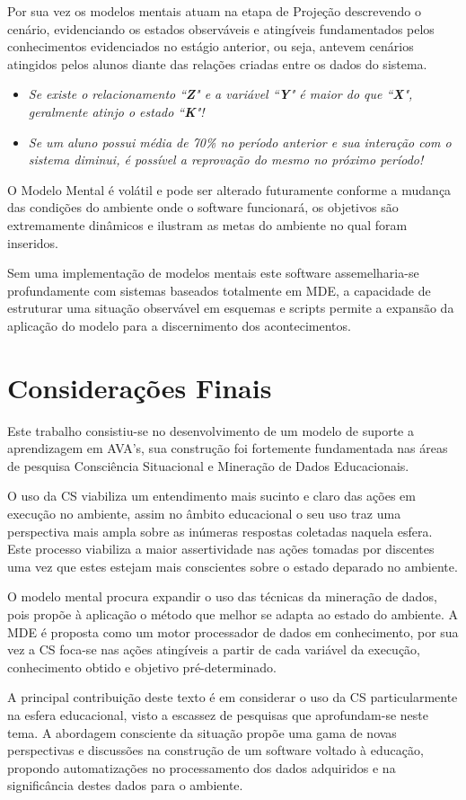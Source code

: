 \documentclass[12pt]{article}
\begin{document}
Por sua vez os modelos mentais atuam na etapa de Projeção descrevendo o cenário, evidenciando os estados observáveis e atingíveis fundamentados pelos conhecimentos evidenciados no estágio anterior, ou seja, antevem cenários atingidos pelos alunos diante das relações criadas entre os dados do sistema.

\begin{itemize}	
	\item \textit{Se existe o relacionamento ``\textbf{Z}" e a variável ``\textbf{Y}" é maior do que ``\textbf{X}", geralmente atinjo o estado ``\textbf{K}"!}
	\item \textit{Se um aluno possui média de 70\% no período anterior e sua interação com o sistema diminui, é possível a reprovação do mesmo no próximo período!}
\end{itemize}

O Modelo Mental é volátil e pode ser alterado futuramente conforme a mudança das condições do ambiente onde o software funcionará, os objetivos são extremamente dinâmicos e ilustram as metas do ambiente no qual foram inseridos.

Sem uma implementação de modelos mentais este software assemelharia-se profundamente com sistemas baseados totalmente em MDE, a capacidade de estruturar uma situação observável em esquemas e scripts permite a expansão da aplicação do modelo para a discernimento dos acontecimentos.

\section{Considerações Finais}

Este trabalho consistiu-se no desenvolvimento de um modelo de suporte a aprendizagem em AVA’s, sua construção foi fortemente fundamentada nas áreas de pesquisa Consciência Situacional e Mineração de Dados Educacionais.

O uso da CS viabiliza um entendimento mais sucinto e claro das ações em execução no ambiente, assim no âmbito educacional o seu uso traz uma perspectiva mais ampla sobre as inúmeras respostas coletadas naquela esfera. Este processo viabiliza a maior assertividade nas ações tomadas por discentes uma vez que estes estejam mais conscientes sobre o estado deparado no ambiente.

O modelo mental procura expandir o uso das técnicas da mineração de dados, pois propõe à aplicação o método que melhor se adapta ao estado do ambiente. A MDE é proposta como um motor processador de dados em conhecimento, por sua vez a CS foca-se nas ações atingíveis a partir de cada variável da execução, conhecimento obtido e objetivo pré-determinado.

A principal contribuição deste texto é em considerar o uso da CS particularmente na esfera educacional, visto a escassez de pesquisas que aprofundam-se neste tema. A abordagem consciente da situação propõe uma gama de novas perspectivas e discussões na construção de um software voltado à educação, propondo automatizações no processamento dos dados adquiridos e na significância destes dados para o ambiente.  



\end{document}
